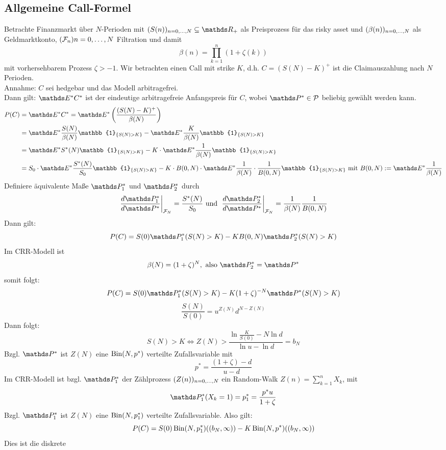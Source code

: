 \subsection{Allgemeine Call-Formel}
\label{sub:allg_call-formel}
Betrachte Finanzmarkt über $N$-Perioden mit $(S(n))_{n=0\dt{,}N}\subseteq \R_+$ als Preisprozess für das risky asset und $(\beta(n))_{n=0, \dots ,N}$ als Geldmarktkonto, $(\mathcal{F}_n){n=0, \dots ,N}$ Filtration und damit
\[
\beta(n)=\prod_{k=1}^{n}(1+\zeta(k))
\]
mit vorhersehbarem Prozess $\zeta>-1$.
Wir betrachten einen Call mit strike $K$, d.h. $C=(S(N)-K)^+$ ist die Claimauszahlung nach $N$ Perioden.\\
Annahme: $C$ sei hedgebar und das Modell arbitragefrei.\\
Dann gilt: $\E^*C^*$ ist der eindeutige arbitragefreie Anfangspreis für $C$, wobei $\Pw^*\in \mc{P}$ beliebig gewählt werden kann.
\begin{equation*}
\begin{aligned}
	P(C)&=\E^*C^*=\E^*\enbrace{\frac{(S(N)-K)^+}{\beta(N)}}\\
	&= \E^*\frac{S(N)}{\beta(N)}\mathbb{1}_{\penbrace{S(N)>K}}-\E^*\frac{K}{\beta(N)}\mathbb{1}_{\penbrace{S(N)>K}}\\
	&= \E^*S^*(N)\mathbb{1}_{\penbrace{S(N)>K}}-K\cdot\E^*\frac{1}{\beta(N)}\mathbb{1}_{\penbrace{S(N)>K}}\\
	&= S_0\cdot \E^*\frac{S^*(N)}{S_0}\mathbb{1}_{\penbrace{S(N)>K}}-K\cdot B(0,N)\cdot \E^*\frac{1}{\beta(N)}\cdot\frac{1}{B(0,N)}\mathbb{1}_{\penbrace{S(N)>K}} \text{ mit } B(0,N):=\E^*\frac{1}{\beta(N)}
\end{aligned}
\end{equation*}
Definiere äquivalente Maße $\Pw_1^*$ und $\Pw_2^*$ durch
\[
\left.\frac{d\Pw_1^*}{d\Pw^*}\right|_{\F_N}=\frac{S^*(N)}{S_0}\text{ und } \left.\frac{d\Pw_2^*}{d\Pw^*}\right|_{\F_N}=\frac{1}{\beta(N)}\frac{1}{B(0,N)}
\]
Dann gilt:
\[
P(C)=S(0)\Pw_1^*(S(N)>K)-KB(0,N)\Pw_2^*(S(N)>K)
\]
Im CRR-Modell ist
\[
\beta(N)=(1+\zeta)^N,\text{ also }\Pw_2^*=\Pw^*
\]
somit folgt:
\[
P(C)=S(0)\Pw_1^*(S(N)>K)-K(1+\zeta)^{-N}\Pw^*(S(N)>K)
\]
\[
\frac{S(N)}{S(0)}=u^{Z(N)}d^{N-Z(N)}
\]
Dann folgt:
\[
S(N)>K\Leftrightarrow Z(N)>\frac{\ln\frac{K}{S(0)}-N\ln d}{\ln u-\ln d}=b_N
\]
Bzgl. $\Pw^*$ ist $Z(N)$ eine $\operatorname{Bin}(N,p^*)$ verteilte Zufallsvariable mit
\[
p^*=\frac{(1+\zeta)-d}{u-d}
\]
Im CRR-Modell ist bzgl. $\Pw_1^*$ der Zählprozess $(Z(n))_{n=0, \dots ,N}$ ein Random-Walk $Z(n)=\sum_{k=1}^{n}X_k$, mit 
\[
\Pw_1^*(X_k=1)=p_1^*=\frac{p^*u}{1+\zeta}
\]
Bzgl. $\Pw_1^*$ ist $Z(N)$ eine $\operatorname{Bin}(N,p_1^*)$ verteilte Zufallsvariable. Also gilt:
\[
P(C)=S(0)\operatorname{Bin}(N,p_1^*)((b_N,\infty))-K\operatorname{Bin}(N,p^*)((b_N,\infty))
\]
Dies ist die diskrete 
\newpage

